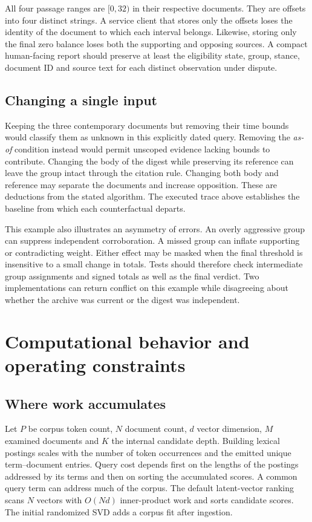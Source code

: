 All four passage ranges are $[0,32)$ in their respective documents. They are offsets into four distinct strings. A service client that stores only the offsets loses the identity of the document to which each interval belongs. Likewise, storing only the final zero balance loses both the supporting and opposing sources. A compact human-facing report should preserve at least the eligibility state, group, stance, document ID and source text for each distinct observation under dispute.

\subsection{Changing a single input}
Keeping the three contemporary documents but removing their time bounds would classify them as unknown in this explicitly dated query. Removing the \emph{as-of} condition instead would permit unscoped evidence lacking bounds to contribute. Changing the body of the digest while preserving its reference can leave the group intact through the citation rule. Changing both body and reference may separate the documents and increase opposition. These are deductions from the stated algorithm. The executed trace above establishes the baseline from which each counterfactual departs.

This example also illustrates an asymmetry of errors. An overly aggressive group can suppress independent corroboration. A missed group can inflate supporting or contradicting weight. Either effect may be masked when the final threshold is insensitive to a small change in totals. Tests should therefore check intermediate group assignments and signed totals as well as the final verdict. Two implementations can return conflict on this example while disagreeing about whether the archive was current or the digest was independent.

\section{Computational behavior and operating constraints}
\subsection{Where work accumulates}
Let $P$ be corpus token count, $N$ document count, $d$ vector dimension, $M$ examined documents and $K$ the internal candidate depth. Building lexical postings scales with the number of token occurrences and the emitted unique term--document entries. Query cost depends first on the lengths of the postings addressed by its terms and then on sorting the accumulated scores. A common query term can address much of the corpus. The default latent-vector ranking scans $N$ vectors with $O(Nd)$ inner-product work and sorts candidate scores. The initial randomized SVD adds a corpus fit after ingestion.

